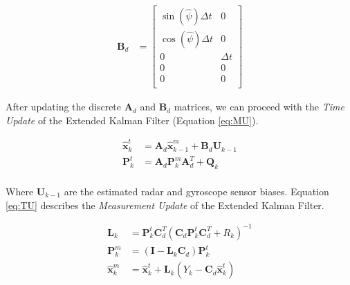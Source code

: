 \documentclass[12pt,letterpaper, onecolumn]{exam}
\begin{document}
\begin{questions}
{        \begin{equation}
            \begin{split}
                \mathbf{B}_d & =
                \begin{bmatrix}
                    \sin(\hat{\psi})\Delta t & 0        \\
                    \cos(\hat{\psi})\Delta t & 0        \\
                    0                        & \Delta t \\
                    0                        & 0        \\
                    0                        & 0        \\
                \end{bmatrix}
            \end{split}
            \label{eq:bd}
        \end{equation}

        After updating the discrete $\mathbf{A}_d$ and $\mathbf{B}_d$ matrices, we can proceed with the \textit{Time Update} of the Extended Kalman Filter (Equation \ref{eq:MU}).

        \begin{equation}
            \begin{split}
                \mathbf{\hat{x}}^t_k & = \mathbf{A}_d \mathbf{\hat{x}}^m_{k-1} + \mathbf{B}_d \mathbf{U}_{k-1}\\
                \mathbf{P}^t_k & = \mathbf{A}_d \mathbf{P}^m_k \mathbf{A}_d^T + \mathbf{Q}_k\\
            \end{split}
            \label{eq:MU}
        \end{equation}

        Where $\mathbf{U}_{k-1}$ are the estimated radar and gyroscope sensor biases. Equation \ref{eq:TU} describes the \textit{Measurement Update} of the Extended Kalman Filter.

        \begin{equation}
            \begin{split}
                \mathbf{L}_k & = \mathbf{P}^t_k \mathbf{C}^T_d \left(\mathbf{C}_d \mathbf{P}^t_k \mathbf{C}_d^T + R_k\right)^{-1}\\
                \mathbf{P}^m_k & = \left(\mathbf{I} - \mathbf{L}_k \mathbf{C}_d\right)\mathbf{P}^t_k \\
                \mathbf{\hat{x}}^m_k & = \mathbf{\hat{x}}^t_k + \mathbf{L}_k \left(Y_k - \mathbf{C}_d \mathbf{\hat{x}}^t_k\right) \\
            \end{split}
            \label{eq:TU}
        \end{equation}

}
\end{questions}
\end{document}
